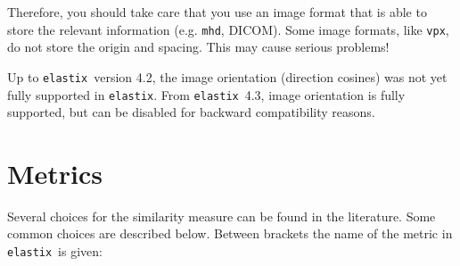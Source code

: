 \documentclass[]{report}
\newcommand{\elastix}{\texttt{elastix}}
\begin{document}
Therefore, you should take care that you use an image format that
is able to store the relevant information (e.g. \texttt{mhd},
DICOM). Some image formats, like \texttt{vpx}, do not store the
origin and spacing. This may cause serious problems!

Up to \elastix\ version 4.2, the image orientation (direction
cosines) was not yet fully supported in \elastix. From \elastix\
4.3, image orientation is fully supported, but can be disabled for
backward compatibility reasons.

\section{Metrics}\label{sec:comp:metric}

Several choices for the similarity measure can be found in the
literature. Some common choices are described below. Between brackets
the name of the metric in \elastix\ is given:
\end{document}
